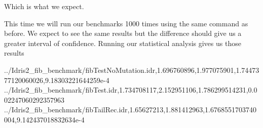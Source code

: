 \documentclass[
]{article}
\newenvironment{Shaded}{}{}
\newcommand{\DataTypeTok}[1]{\textcolor[rgb]{0.56,0.13,0.00}{#1}}
\newcommand{\FloatTok}[1]{\textcolor[rgb]{0.25,0.63,0.44}{#1}}
\newcommand{\NormalTok}[1]{#1}
\newcommand{\OperatorTok}[1]{\textcolor[rgb]{0.40,0.40,0.40}{#1}}
\begin{document}
Which is what we expect.

This time we will run our benchmarks 1000 times using the same command
as before. We expect to see the same results but the difference should
give us a greater interval of confidence. Running our statistical
analysis gives us those results

\begin{Shaded}
\begin{Highlighting}[]
\OperatorTok{../}\DataTypeTok{Idris2\_fib\_benchmark}\OperatorTok{/}\NormalTok{fibTestNoMutation}\OperatorTok{.}\NormalTok{idr,}\FloatTok{1.696760896}\NormalTok{,}\FloatTok{1.977075901}\NormalTok{,}\FloatTok{1.7447377120060026}\NormalTok{,}\FloatTok{9.18303221644259e{-}4}
\OperatorTok{../}\DataTypeTok{Idris2\_fib\_benchmark}\OperatorTok{/}\NormalTok{fibTest}\OperatorTok{.}\NormalTok{idr,}\FloatTok{1.734708117}\NormalTok{,}\FloatTok{2.152951106}\NormalTok{,}\FloatTok{1.786299514231}\NormalTok{,}\FloatTok{0.002247060292357963}
\OperatorTok{../}\DataTypeTok{Idris2\_fib\_benchmark}\OperatorTok{/}\NormalTok{fibTailRec}\OperatorTok{.}\NormalTok{idr,}\FloatTok{1.65627213}\NormalTok{,}\FloatTok{1.881412963}\NormalTok{,}\FloatTok{1.6768551703740004}\NormalTok{,}\FloatTok{9.142437018832634e{-}4}


\end{Highlighting}
\end{Shaded}
\end{document}
